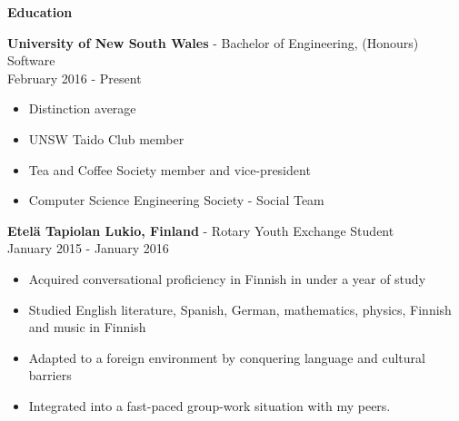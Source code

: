 \documentclass{article}
\newcommand{\minititle}[1]{\begin{center}\textbf{#1} \end{center} \vspace{0.2cm}}
\newcommand{\resumeEntry}[3]{{\large \textbf{#1} - #2} \\ \small{#3}}
\begin{document}
\begin{minipage}[t]{0.6\linewidth}
{\begin{itemize}
        \end{itemize}
    }
    {
        \vspace{0.2cm}
        \minititle{Education}
        \resumeEntry{University of New South Wales}{Bachelor of Engineering, (Honours) Software}{February 2016 - Present}
        \begin{itemize}
            \setlength\itemsep{0.05cm}
            \item Distinction average
            \item UNSW Taido Club member
            \item Tea and Coffee Society member and vice-president
            \item Computer Science Engineering Society - Social Team
        \end{itemize}
        \vspace{0.4cm}
        \resumeEntry{Etel{\"a} Tapiolan Lukio, Finland}{Rotary Youth Exchange Student}{January 2015 - January 2016}
        \begin{itemize}
            \setlength\itemsep{0.05cm}
            \item Acquired conversational proficiency in Finnish in under a year of study
            \item Studied English literature, Spanish, German, mathematics, physics, Finnish and music in Finnish
            \item Adapted to a foreign environment by conquering language and cultural barriers
            \item Integrated into a fast-paced group-work situation with my peers.

        \end{itemize}
    }
\end{minipage}\hspace{1cm}
\end{document}
